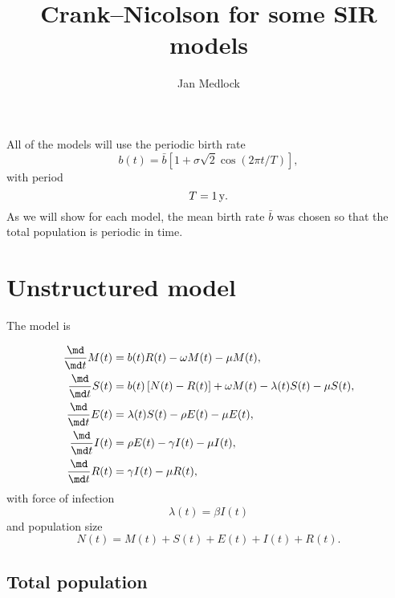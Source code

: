 \documentclass{jpmarticle}
\title{Crank--Nicolson for some SIR models}
\author{Jan Medlock}
\let\subequationsorig\subequations%
\let\endsubequationsorig\endsubequations%
\renewenvironment{subequations}{
  \subequationsorig
  \renewcommand{\theequation}{\theparentequation.\arabic{equation}}
}{
  \endsubequationsorig
}
\begin{document}
\maketitle


All of the models will use the periodic birth rate
\begin{equation}
  b(t) = \bar{b} \left[
    1 + \sigma \sqrt{2} \cos\left(2 \pi t / T\right)
  \right],
\end{equation}
with period
\begin{equation}
  T = \unit[1]{y}.
\end{equation}
As we will show for each model, the mean birth rate $\bar{b}$
was chosen so that the total population is periodic in time.


\section{Unstructured model}

The model is
\begin{subequations}
  \label{model_unstructured}
  \begin{align}
    \frac{\md}{\md t} M(t) &=
    b(t) R(t) - \omega M(t) - \mu M(t),
    \\
    \frac{\md}{\md t} S(t) &=
    b(t) \left[N(t) - R(t)\right] + \omega M(t) - \lambda(t) S(t) - \mu S(t),
    \\
    \frac{\md}{\md t} E(t) &=
    \lambda(t) S(t) - \rho E(t) - \mu E(t),
    \\
    \frac{\md}{\md t} I(t) &=
    \rho E(t) - \gamma I(t) - \mu I(t),
    \\
    \frac{\md}{\md t} R(t) &=
    \gamma I(t) - \mu R(t),
  \end{align}
  with force of infection
  \begin{equation}
    \lambda(t) = \beta I(t)
  \end{equation}
  and population size
  \begin{equation}
    N(t) = M(t) + S(t) + E(t) + I(t) + R(t).
  \end{equation}
\end{subequations}


\subsection{Total population}
\end{document}
